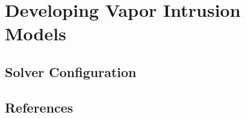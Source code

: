 \documentclass[../thesis.tex]{subfiles}
\begin{document}
\chapter{Developing Vapor Intrusion Models}








\section{Solver Configuration}


\section{References}
\end{document}
